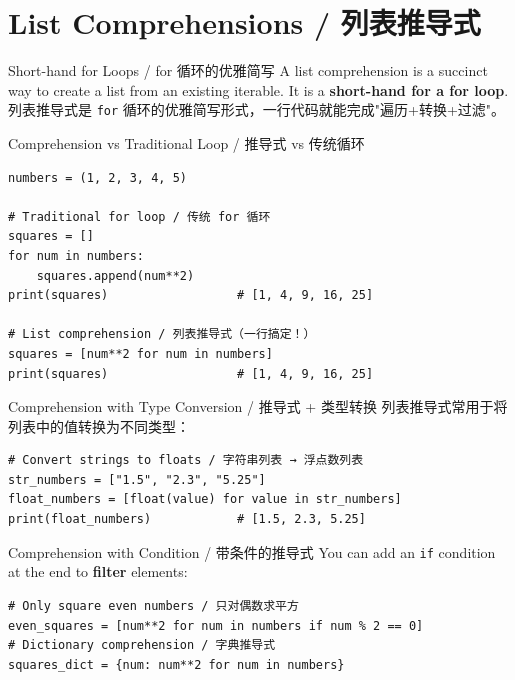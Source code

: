 \documentclass[11pt,a4paper]{report}
\let\oldtexttt\texttt
\renewcommand{\texttt}[1]{\textcolor{mainblue}{\oldtexttt{#1}}}
\begin{document}
\section{List Comprehensions / 列表推导式}

\begin{concept}{Short-hand for Loops / for 循环的优雅简写}
    A list comprehension is a succinct way to create a list from an existing iterable. It is a \textbf{short-hand for a for loop}. \\
    列表推导式是 \texttt{for} 循环的优雅简写形式，一行代码就能完成"遍历+转换+过滤"。
\end{concept}

\begin{examplebox}{Comprehension vs Traditional Loop / 推导式 vs 传统循环}
\begin{lstlisting}
numbers = (1, 2, 3, 4, 5)

# Traditional for loop / 传统 for 循环
squares = []
for num in numbers:
    squares.append(num**2)
print(squares)                  # [1, 4, 9, 16, 25]

# List comprehension / 列表推导式（一行搞定！）
squares = [num**2 for num in numbers]
print(squares)                  # [1, 4, 9, 16, 25]
\end{lstlisting}
\end{examplebox}

\begin{examplebox}{Comprehension with Type Conversion / 推导式 + 类型转换}
    列表推导式常用于将列表中的值转换为不同类型：
\begin{lstlisting}
# Convert strings to floats / 字符串列表 → 浮点数列表
str_numbers = ["1.5", "2.3", "5.25"]
float_numbers = [float(value) for value in str_numbers]
print(float_numbers)            # [1.5, 2.3, 5.25]
\end{lstlisting}
\end{examplebox}

\begin{concept}{Comprehension with Condition / 带条件的推导式}
    You can add an \texttt{if} condition at the end to \textbf{filter} elements:
\begin{lstlisting}
# Only square even numbers / 只对偶数求平方
even_squares = [num**2 for num in numbers if num % 2 == 0]
# Dictionary comprehension / 字典推导式
squares_dict = {num: num**2 for num in numbers}
    \end{lstlisting}
\end{concept}
\end{document}

